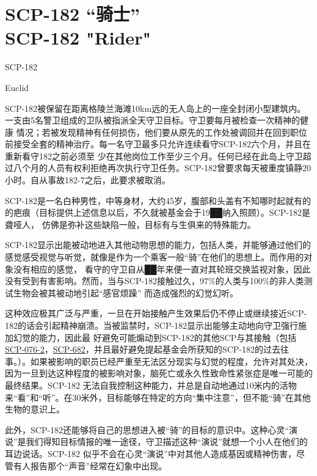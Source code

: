 \chapter[SCP-182 “骑士”]{
    SCP-182 “骑士”\\
    SCP-182 "Rider"
}

\label{chap:SCP-182}

SCP-182

Euclid

SCP-182被保留在距离格陵兰海滩10km远的无人岛上的一座全封闭小型建筑内。一支由5名警卫组成的卫队被指派全天守卫目标。守卫要每月被检查一次精神的健康
情况；若被发现精神有任何损伤，他们要从原先的工作处被调回并在回到职位前接受全套的精神治疗。每一名守卫最多只允许连续看守SCP-182六个月，并且在重新看守182之前必须至
少在其他岗位工作至少三个月。任何已经在此岛上守卫超过八个月的人员有权利拒绝再次执行守卫任务。SCP-182曾要求每天被重度镇静20小时。自从事故182-7之后，此要求被取消。

SCP-182是一名白种男性，中等身材，大约45岁，腹部和头盖有不知哪时起就有的的疤痕（目标提供上述信息以后，不久就被基金会于19██纳入照顾）。SCP-182是聋哑人，
仿佛是弥补这些缺陷一般，目标有与生俱来的特殊能力。

SCP-182显示出能被动地进入其他动物思想的能力，包括人类，并能够通过他们的感觉感受视觉与听觉，就像是作为一个乘客一般“骑”在他们的思想上。而作用的对象没有相应的感觉，
看守的守卫自从██年来便一直对其轮班交换监视对象，因此没有受到有害影响。然而，当与SCP-182接触过久，97\%的人类与100\%的非人类测试生物会被其被动地引起“感官烦躁”
而造成强烈的幻觉幻听。

这种效应极其广泛与严重，一旦在开始接触产生效果后仍不停止或继续接近SCP-182的话会引起精神崩溃。当被监禁时，SCP-182显示出能够主动地向守卫强行施加幻觉的能力，因此最
好避免可能煽动到SCP-182的其他SCP与其接触（包括\hyperref[chap:SCP-076]{SCP-076-2}，\hyperref[chap:SCP-682]{SCP-682}，并且最好避免提起基金会所获知的SCP-182的过去往
事。）。如果被影响的职员已经严重至无法区分现实与幻觉的程度，允许对其处决，因为一旦到达这种程度的被影响对象，脑死亡或永久性致命性紧张症是唯一可能的最终结果。SCP-182
无法自我控制这种能力，并总是自动地通过10米内的活物来“看”和“听”。在30米外，目标能够在特定的方向“集中注意”，但不能“骑”在其他生物的意识上。

此外，SCP-182还能够将自己的思想进入被“骑”的目标的意识中。这种心灵“演说”是我们得知目标情报的唯一途径，守卫描述这种“演说”就想一个小人在他们的耳边说话。SCP-182
似乎不会在心灵“演说”中对其他人造成基因或精神伤害，尽管有人报告那个“声音”经常在幻象中出现。

